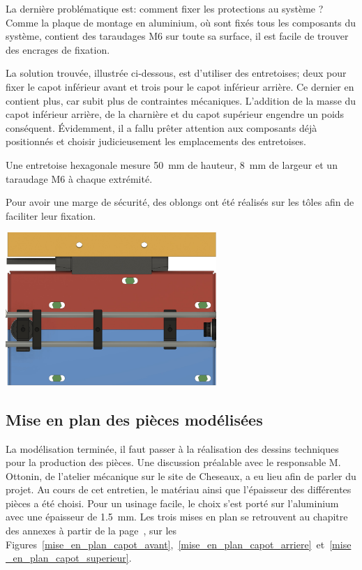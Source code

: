 \begin{minipage}{\textwidth}
    La dernière problématique est: comment fixer les protections au système ? Comme la plaque de montage en aluminium, où sont fixés tous les composants du système, contient des taraudages M6 sur toute sa surface, il est facile de trouver des encrages de fixation.

    La solution trouvée, illustrée ci-dessous, est d'utiliser des entretoises; deux pour fixer le capot inférieur avant et trois pour le capot inférieur arrière. Ce dernier en contient plus, car subit plus de contraintes mécaniques. L'addition de la masse du capot inférieur arrière, de la charnière et du capot supérieur engendre un poids conséquent. Évidemment, il a fallu prêter attention aux composants déjà positionnés et choisir judicieusement les emplacements des entretoises.

    Une entretoise hexagonale mesure 50~mm de hauteur, 8~mm de largeur et un taraudage M6 à chaque extrémité.

    Pour avoir une marge de sécurité, des oblongs ont été réalisés sur les tôles afin de faciliter leur fixation.
    \vspace{1em}
    \begin{center}
        \includegraphics[width=0.6\textwidth]{assets/figures/Protections_laser/Securite_mecanique/Protection_entree_laser/contrainte_entretoises.jpeg}
    \end{center}
    \label{contrainte_entretoises}
\end{minipage}

\subsection{Mise en plan des pièces modélisées}
La modélisation terminée, il faut passer à la réalisation des dessins techniques pour la production des pièces. Une discussion préalable avec le responsable M. Ottonin, de l'atelier mécanique sur le site de Cheseaux, a eu lieu afin de parler du projet. Au cours de cet entretien, le matériau ainsi que l'épaisseur des différentes pièces a été choisi. Pour un usinage facile, le choix s'est porté sur l'aluminium avec une épaisseur de 1.5~mm. Les trois mises en plan se retrouvent au chapitre des annexes à partir de la page~\pageref{Mises_En_Plan}, sur les Figures~\ref{mise_en_plan_capot_avant},~\ref{mise_en_plan_capot_arriere}~et~\ref{mise_en_plan_capot_superieur}.






